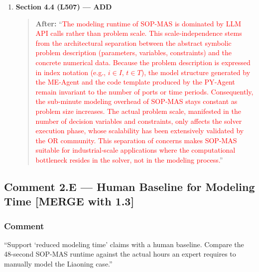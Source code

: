 \documentclass[11pt,a4paper]{article}
\begin{document}
\begin{enumerate}
\item \textbf{Section 4.4 (L507) --- ADD}
\begin{quote}
\textbf{After:} ``\textcolor{red}{The modeling runtime of SOP-MAS is dominated by LLM API calls rather than problem scale. This scale‑independence stems from the architectural separation between the abstract symbolic problem description (parameters, variables, constraints) and the concrete numerical data. Because the problem description is expressed in index notation (e.g., $i \in I$, $t \in T$), the model structure generated by the ME‑Agent and the code template produced by the PY‑Agent remain invariant to the number of ports or time periods. Consequently, the sub‑minute modeling overhead of SOP‑MAS stays constant as problem size increases. The actual problem scale, manifested in the number of decision variables and constraints, only affects the solver execution phase, whose scalability has been extensively validated by the OR community. This separation of concerns makes SOP‑MAS suitable for industrial‑scale applications where the computational bottleneck resides in the solver, not in the modeling process.}''
\end{quote}
\end{enumerate}

\subsection{Comment 2.E --- Human Baseline for Modeling Time \textbf{[MERGE with 1.3]}}

\subsubsection{Comment}
``Support `reduced modeling time' claims with a human baseline. Compare the 48-second SOP-MAS runtime against the actual hours an expert requires to manually model the Liaoning case.''
\end{document}
